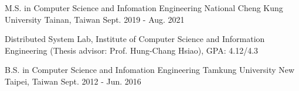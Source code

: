 

\begin{cventries}

  \cventry
    {M.S. in Computer Science and Infomation Engineering} %
    {National Cheng Kung University} %
    {Tainan, Taiwan} %
    {Sept. 2019 - Aug. 2021} %
    {
      \begin{cvitems} %
        \item {Distributed System Lab, Institute of Computer Science and Information Engineering (Thesis advisor: Prof. Hung-Chang Hsiao), GPA: 4.12/4.3}
      \end{cvitems}
    }

  \cventry
    {B.S. in Computer Science and Infomation Engineering} %
    {Tamkung University} %
    {New Taipei, Taiwan} %
    {Sept. 2012 - Jun. 2016} %
    {
      \begin{cvitems} %
        \item {}
      \end{cvitems}
    }

\end{cventries}
